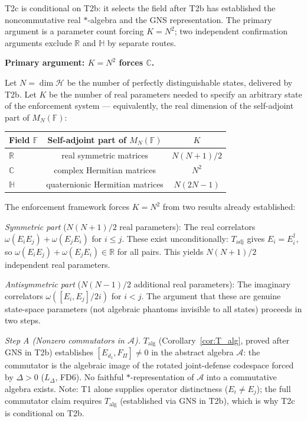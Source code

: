 \documentclass[11pt]{article}
\theoremstyle{remark}
\begin{document}
\begin{tcolorbox}[apfbox, title={T2c: Selection of the Complex Branch}]
\smallskip\noindent T2c is conditional on T2b: it selects the field after T2b has established the noncommutative real $*$-algebra and the GNS representation.  The primary argument is a parameter count forcing $K = N^2$; two independent confirmation arguments exclude $\mathbb{R}$ and $\mathbb{H}$ by separate routes.

\smallskip\noindent\textbf{Primary argument: $K = N^2$ forces $\mathbb{C}$.}

Let $N = \dim\mathcal{H}$ be the number of perfectly distinguishable states, delivered by T2b.  Let $K$ be the number of real parameters needed to specify an arbitrary state of the enforcement system — equivalently, the real dimension of the self-adjoint part of $M_N(\mathbb{F})$:

\begin{center}
\begin{tabular}{lcc}
\toprule
Field $\mathbb{F}$ & Self-adjoint part of $M_N(\mathbb{F})$ & $K$ \\
\midrule
$\mathbb{R}$ & real symmetric matrices & $N(N+1)/2$ \\
$\mathbb{C}$ & complex Hermitian matrices & $N^2$ \\
$\mathbb{H}$ & quaternionic Hermitian matrices & $N(2N-1)$ \\
\bottomrule
\end{tabular}
\end{center}

The enforcement framework forces $K = N^2$ from two results already established:

\textit{Symmetric part} ($N(N+1)/2$ real parameters): The real correlators $\omega(E_i E_j) + \omega(E_j E_i)$ for $i \le j$.  These exist unconditionally: $T_{\mathrm{adj}}$ gives $E_i = E_i^\dagger$, so $\omega(E_i E_j) + \omega(E_j E_i) \in \mathbb{R}$ for all pairs.  This yields $N(N+1)/2$ independent real parameters.

\textit{Antisymmetric part} ($N(N-1)/2$ additional real parameters): The imaginary correlators $\omega([E_i, E_j]/2i)$ for $i < j$.  The argument that these are genuine state-space parameters (not algebraic phantoms invisible to all states) proceeds in two steps.

\textit{Step A (Nonzero commutators in $\mathcal{A}$).}  $T_{\mathrm{alg}}$ (Corollary~\ref{cor:T_alg}, proved after GNS in T2b) establishes $[E_{d_1}, F_\Pi] \ne 0$ in the abstract algebra $\mathcal{A}$: the commutator is the algebraic image of the rotated joint-defense codespace forced by $\Delta > 0$ ($L_\Delta$, FD6).  No faithful $*$-representation of $\mathcal{A}$ into a commutative algebra exists.  Note: T1 alone supplies operator distinctness ($E_i \ne E_j$); the full commutator claim requires $T_{\mathrm{alg}}$ (established via GNS in T2b), which is why T2c is conditional on T2b.


\end{tcolorbox}
\end{document}
